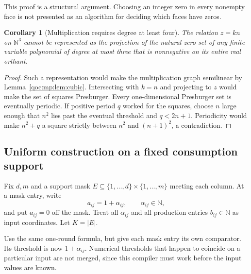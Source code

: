 \documentclass[11pt,letterpaper]{article}
\newtheorem{corollary}[theorem]{Corollary}
\theoremstyle{definition}
\theoremstyle{remark}
\newcommand{\N}{\mathbb N}
\begin{document}
This proof is a structural argument. Choosing an integer zero in every
nonempty face is not presented as an algorithm for deciding which faces
have zeros.

\begin{corollary}[Multiplication requires degree at least four]\label{qoc:mp:cor:mult}
The relation $z=kn$ on $\N^3$ cannot be represented as the projection of
the natural zero set of any finite-variable polynomial of degree at most
three that is nonnegative on its entire real orthant.
\end{corollary}
\begin{proof}
Such a representation would make the multiplication graph semilinear by
Lemma~\ref{qoc:mp:lem:cubic}. Intersecting with $k=n$ and projecting to $z$ would
make the set of squares Presburger. Every one-dimensional Presburger set
is eventually periodic. If positive period $q$ worked for the squares,
choose $n$ large enough that $n^2$ lies past the eventual threshold and
$q<2n+1$. Periodicity would make $n^2+q$ a square strictly between $n^2$
and $(n+1)^2$, a contradiction.
\end{proof}

\subsection{Uniform construction on a fixed consumption support}
Fix $d,m$ and a support mask $E\subseteq\{1,\ldots,d\}\times\{1,\ldots,m\}$
meeting each column. At a mask entry, write
\[
 a_{ij}=1+\alpha_{ij},\qquad\alpha_{ij}\in\N,
\]
and put $a_{ij}=0$ off the mask. Treat all $\alpha_{ij}$ and all production
entries $b_{ij}\in\N$ as input coordinates. Let $K=|E|$.

Use the same one-round formula, but give each mask entry its own
comparator. Its threshold is now $1+\alpha_{ij}$. Numerical thresholds
that happen to coincide on a particular input are not merged, since
this compiler must work before the input values are known.
\end{document}

